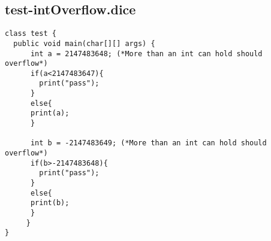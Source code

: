 \subsection{test-intOverflow.dice}
\begin{verbatim}
class test {
  public void main(char[][] args) {
      int a = 2147483648; (*More than an int can hold should overflow*)
      if(a<2147483647){
      	print("pass");
      }
      else{
      print(a);
      }

      int b = -2147483649; (*More than an int can hold should overflow*)
      if(b>-2147483648){
      	print("pass");
      }
      else{
      print(b);
      }
     }
}
\end{verbatim}